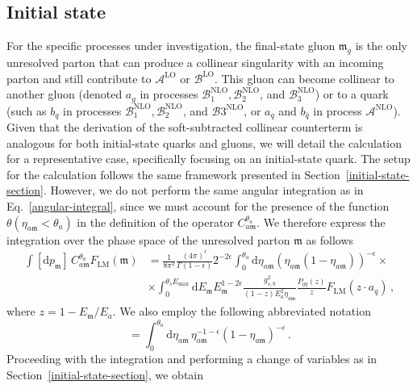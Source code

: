 \documentclass[a4paper, 12pt]{book}
\newcommand{\um}{\mathfrak{m}}
\begin{document}
\subsection{Initial state}
\label{initial-state-parameters-section}
For the specific processes under investigation, the final-state gluon $\um_g$ is the only unresolved parton that can produce a collinear singularity with an incoming parton and still contribute to $\mathcal{A}^{\mathrm{LO}}$ or $\mathcal{B}^{\mathrm{LO}}$. This gluon can become collinear to another gluon (denoted $a_g$ in processes $\mathcal{B}_1^{\mathrm{NLO}}, \mathcal{B}_2^{\mathrm{NLO}}$, and $\mathcal{B}_3^{\mathrm{NLO}}$) or to a quark (such as $b_q$ in processes $\mathcal{B}_1^{\mathrm{NLO}}, \mathcal{B}_2^{\mathrm{NLO}}$, and $\mathcal{B}3^{\mathrm{NLO}}$, or $a_q$ and $b_{\bar{q}}$ in process $\mathcal{A}^{\mathrm{NLO}}$). Given that the derivation of the soft-subtracted collinear counterterm is analogous for both initial-state quarks and gluons, we will detail the calculation for a representative case, specifically focusing on an initial-state quark. The setup for the calculation follows the same framework presented in Section~\ref{initial-state-section}. However, we do not perform the same angular integration as in Eq.~\ref{angular-integral}, since we must account for the presence of the function $\theta(\eta_{a\um}<\theta_a)$ in the definition of the operator $C_{a\um}^{\theta_a}$. We therefore express the integration over the phase space of the unresolved parton $\um$ as follows
\begin{equation}
  \begin{aligned}
  \int [\mathrm{d}p_\um]\, C_{a\um}^{\theta_a}  F_{\mathrm{LM}} (\um) &= \frac{1}{8\pi^2} \frac{(4\pi)^{\epsilon}}{\Gamma(1-\epsilon)} 2^{-2\epsilon} \int_0^{\theta_a} \mathrm{d}\eta_{a\um} (\eta_{a\um}(1-\eta_{a\um}))^{-\epsilon} \times \\
  & \times \int_{0}^{\theta_s E_{\mathrm{max}}} \mathrm{d}E_\um E_\um^{1-2\epsilon} \frac{g_{s,b}^2}{(1-z)E_a^2 \eta_{a\um}} \frac{P_{qq}(z)}{z} F_{\mathrm{LM}} (z \cdot a_q) \, ,
  \end{aligned}
\end{equation}
where $z=1-E_\um/E_a$. We also employ the following abbreviated notation
\begin{equation}
  [\mathrm{d}\eta_{a\um \, \theta_a}] = \int_0^{\theta_a} \mathrm{d}\eta_{a\um} \, \eta_{a\um}^{-1-\epsilon}(1-\eta_{a\um})^{-\epsilon} \, .
  \label{eta-definition}
\end{equation}
Proceeding with the integration and performing a change of variables as in Section~\ref{initial-state-section}, we obtain
\end{document}
